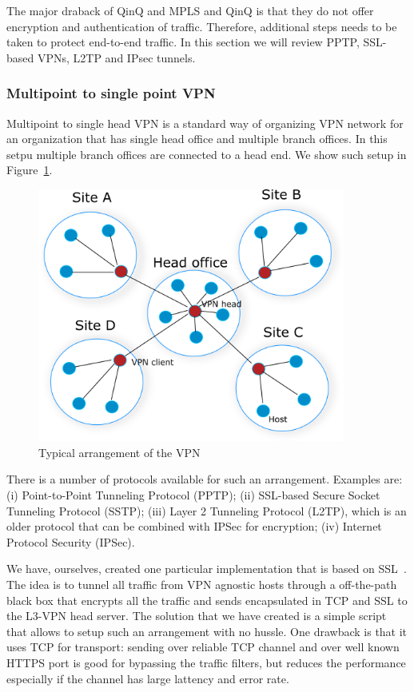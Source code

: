 The major draback of QinQ and MPLS and QinQ is that they do not offer encryption and 
authentication of traffic. Therefore, additional steps needs to be taken to protect end-to-end
traffic. In this section we will review PPTP, SSL-based VPNs, L2TP and IPsec tunnels.

\subsubsection{Multipoint to single point VPN}

Multipoint to single head VPN is a standard way of organizing VPN network
for an organization that has single head office and multiple branch offices.
In this setpu multiple branch offices are connected to a head end. 
We show such setup in Figure~\ref{fig:head-vpn}.

\begin{figure}[ht!]
    \centering
    \includegraphics[width=0.9\textwidth]{graphics/vpn-central.png}
    \caption{Typical arrangement of the VPN}
    \label{fig:head-vpn}
\end{figure}

There is a number of protocols available for such an arrangement. Examples are:
(i) Point-to-Point Tunneling Protocol (PPTP); (ii) SSL-based 
Secure Socket Tunneling Protocol (SSTP); (iii) Layer 2 Tunneling Protocol (L2TP), 
which is an older protocol that can be combined with IPSec for encryption; 
(iv) Internet Protocol Security (IPSec). 

We have, ourselves, created one particular implementation that is based on SSL~\cite{}.
The idea is to tunnel all traffic from VPN agnostic hosts through a off-the-path 
black box that encrypts all the traffic and sends encapsulated in TCP and SSL
to the L3-VPN head server. The solution that we have created is a simple script 
that allows to setup such an arrangement with no hussle. One drawback is that it 
uses TCP for transport: sending over reliable TCP channel and over well known HTTPS port
is good for bypassing the traffic filters, but reduces the performance especially if
the channel has large lattency and error rate. 


